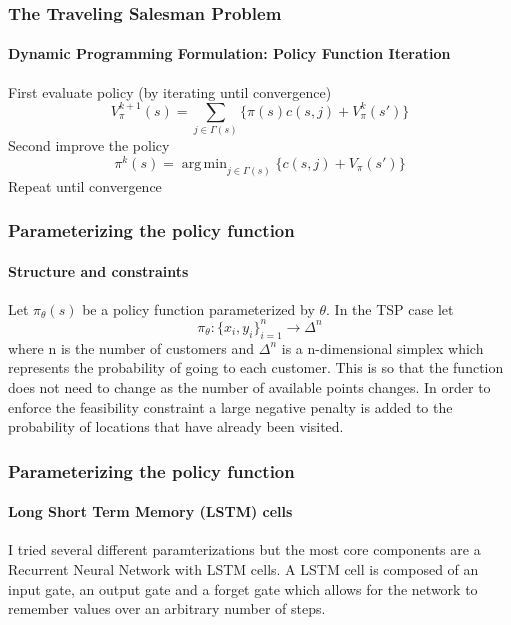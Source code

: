 \documentclass{beamer}
\DeclareMathOperator*{\argmin}{arg\,min}
\begin{document}
\begin{frame}
  \frametitle{The Traveling Salesman Problem}
  \framesubtitle{Dynamic Programming Formulation: Policy Function Iteration}

  First evaluate policy (by iterating until convergence)
  \begin{equation*}
    V^{k+1}_{\pi}(s) = \sum_{j \in \Gamma(s)} \{\pi(s) c(s, j)+V^k_{\pi}(s')\}
  \end{equation*}
  Second improve the policy
  \begin{equation*}
    \pi^k(s) = \argmin_{j \in \Gamma(s)}{\{c(s, j) + V_{\pi}(s')\}}
  \end{equation*}
  Repeat until convergence
\end{frame}


\begin{frame}
  \frametitle{Parameterizing the policy function}
  \framesubtitle{Structure and constraints}
  Let $\pi_\theta(s)$ be a policy function parameterized by $\theta$. In the TSP case let
  \begin{equation*}
    \pi_\theta:\{x_i, y_i\}_{i=1}^n \rightarrow \Delta^n
  \end{equation*}
  where n is the number of customers and $\Delta^n$ is a n-dimensional simplex which represents the probability of going to each customer. This is so that the function does not need to change as the number of available points changes. In order to enforce the feasibility constraint a large negative penalty is added to the probability of locations that have already been visited.
\end{frame}


\begin{frame}
  \frametitle{Parameterizing the policy function}
  \framesubtitle{Long Short Term Memory (LSTM) cells}
  I tried several different paramterizations but the most core components are a Recurrent Neural Network with LSTM cells. A LSTM cell is composed of an input gate, an output gate and a forget gate which allows for the network to remember values over an arbitrary number of steps.
  \begin{figure}[H]
    \centering
  \end{figure}
\end{frame}
\end{document}
